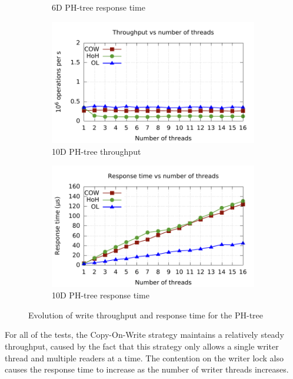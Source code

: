\documentclass[11pt,a4paper]{globis-book}
\begin{document}
\begin{figure}
\begin{subfigure}[b]{0.5\linewidth}
        \caption{6D PH-tree response time}
    \end{subfigure}
    \begin{subfigure}[b]{0.5\linewidth}
        \includegraphics[scale=0.5]{images/plots/insert10d-tp}
        \caption{10D PH-tree throughput}
        \label{fig:exp-conc-write-10d-tp}
    \end{subfigure}%
    \begin{subfigure}[b]{0.5\linewidth}
        \includegraphics[scale=0.5]{images/plots/insert10d-rt}
        \caption{10D PH-tree response time}        
    \end{subfigure}
    \caption{Evolution of write throughput and response time for the PH-tree}
    \label{fig:concurrentd}
\end{figure}

For all of the tests, the Copy-On-Write strategy maintains a relatively steady throughput, caused by the fact that this strategy only allows a single writer thread and multiple readers at a time. The contention on the writer lock also causes the response time to increase as the number of writer threads increases.
\end{document}
